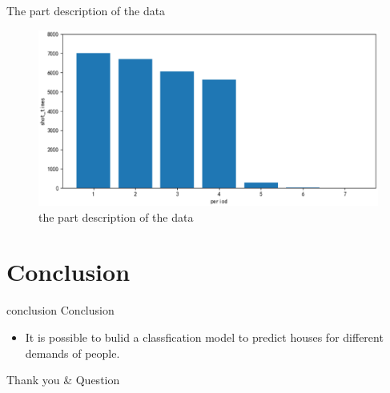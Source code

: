 \documentclass[
 size=14pt,
 paper=smartboard, %
 mode=present, %
 display=slides, %
style=tuliplab,
pauseslide,
fleqn,leqno]{powerdot}
\begin{document}
\begin{slide}{The part description of the data}
	\vspace*{10pt}
	\begin{figure}[htbp]
		\centering
		\includegraphics[scale=0.4]{o.eps}
		\caption{the part description of the data}
	\end{figure}
\end{slide}

\section{Conclusion}
	
\begin{slide}{conclusion}
	Conclusion
	
	\begin{itemize}
		\item  It is possible to bulid a classfication model to predict houses for different demands of people.
	\end{itemize}
\end{slide}
\begin{wideslide}[toc=,bm=]{}
\vspace*{100pt}
\begin{center} 
\hspace*{100pt}	
{\Huge Thank you \& Question }
\end{center}	
\end{wideslide}
\end{document}
